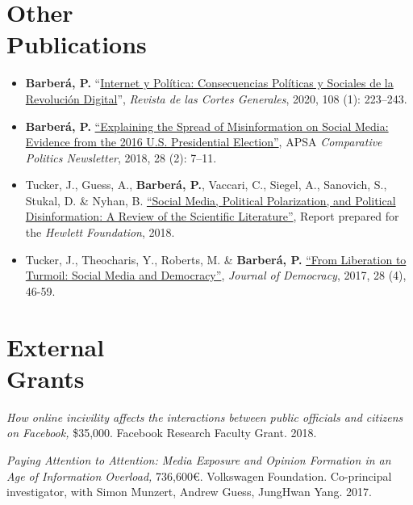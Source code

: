 \documentclass[margin,line,11pt]{resume}
\begin{document}
\begin{resume}
\section{\mysidestyle Other\\Publications}
    \vspace{.15cm}    
\begin{itemize}[leftmargin=5.5mm]
\item[4.] \textbf{Barber\'{a}, P.} ``\href{https://revista.cortesgenerales.es/rcg/article/view/1486}{Internet y Pol\'{i}tica: Consecuencias Pol\'{i}ticas y Sociales de la Revoluci\'{o}n Digital}'', \textit{Revista de las Cortes Generales}, 2020, 108 (1): 223--243.

\item[3.]  \textbf{Barber\'{a}, P.} \href{http://comparativenewsletter.com/files/archived_newsletters/2018_fall.pdf}{``Explaining the Spread of Misinformation on Social Media: Evidence from the 2016 U.S. Presidential Election''}, APSA \textit{Comparative Politics Newsletter}, 2018, 28 (2): 7--11.

\item[2.]  Tucker, J., Guess, A., \textbf{Barber\'{a}, P.}, Vaccari, C., Siegel, A., Sanovich, S., Stukal, D. \& Nyhan, B. \href{https://www.hewlett.org/library/social-media-political-polarization-political-disinformation-review-scientific-literature/}{``Social Media, Political Polarization, and Political Disinformation: A Review of the Scientific Literature''}, Report prepared for the \textit{Hewlett Foundation}, 2018.   

\item[1.]  Tucker, J., Theocharis, Y., Roberts, M. \& \textbf{Barber\'{a}, P.} \href{https://muse.jhu.edu/article/671987/pdf}{``From Liberation to Turmoil: Social Media and Democracy''}, \textit{Journal of Democracy}, 2017, 28 (4), 46-59.   
\end{itemize}     


        \section{\mysidestyle External \\ Grants}
        
\textit{How online incivility affects the interactions between public officials and citizens on Facebook,} \$35,000. Facebook Research Faculty Grant. 2018.        
        
\textit{Paying Attention to Attention: Media Exposure and Opinion Formation in an Age of Information Overload,} 736,600\euro. Volkswagen Foundation. Co-principal investigator, with Simon Munzert, Andrew Guess, JungHwan Yang. 2017.


\end{resume}
\end{document}
